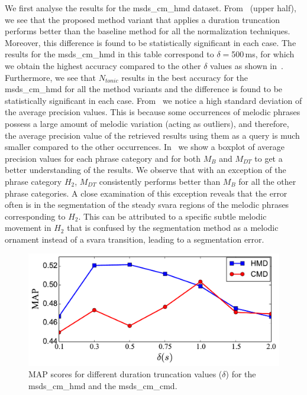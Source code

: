 We first analyse the results for the \acrshort{msds_cm_hmd} dataset. From~ (upper half), we see that the proposed method variant that applies a duration truncation performs better than the baseline method for all the normalization techniques. Moreover, this difference is found to be statistically significant in each case. The results  for the \acrshort{msds_cm_hmd} in this table correspond to $\delta=$500\,ms, for which we obtain the highest accuracy compared to the other $\delta$ values as shown in~. Furthermore, we see that $N_{tonic}$ results in the best accuracy for the \acrshort{msds_cm_hmd} for all the method variants and the difference is found to be statistically significant in each case. From~ we notice a high standard deviation of the average precision values. This is because some occurrences of melodic phrases possess a large amount of melodic variation (acting as outliers), and therefore, the average precision value of the retrieved results using them as a query is much smaller compared to the other occurrences. In~ we show a boxplot of average precision values for each phrase category and for both $M_B$ and $M_{DT}$ to get a better understanding of the results. We observe that with an exception of the phrase category $H_2$, $M_{DT}$ consistently performs better than $M_B$ for all the other phrase categories. A close examination of this exception reveals that the error often is in the segmentation of the steady \gls{svara} regions of the melodic phrases corresponding to $H_2$. This can be attributed to a specific subtle melodic movement in $H_2$ that is confused by the segmentation method as a melodic ornament instead of a \gls{svara} transition, leading to a segmentation error. 


\begin{figure}
	\begin{center}
		\includegraphics[width=\figSizeEightyFive]{ch06_patterns/figures/ImprovingSimilarity/MAP_per_Duration_Truncation.pdf}
	\end{center}
	\caption{MAP scores for different duration truncation values ($\delta$) for the \acrshort{msds_cm_hmd} and the \acrshort{msds_cm_cmd}.} 
	\label{fig:map_per_duration_truncation}
\end{figure}

